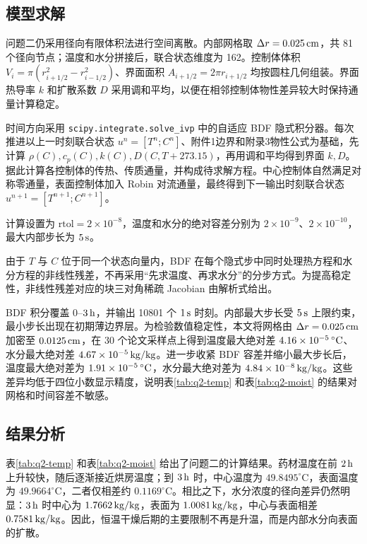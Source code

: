 \documentclass[UTF8,a4paper,12pt]{ctexart}
\begin{document}
\subsection{模型求解}
问题二仍采用径向有限体积法进行空间离散。内部网格取 $\Delta r=0.025\rm\,cm$，共 81 个径向节点；温度和水分拼接后，联合状态维度为 162。控制体体积 $V_i=\pi(r_{i+1/2}^2-r_{i-1/2}^2)$、界面面积 $A_{i+1/2}=2\pi r_{i+1/2}$ 均按圆柱几何组装。界面热导率 $k$ 和扩散系数 $D$ 采用调和平均，以便在相邻控制体物性差异较大时保持通量计算稳定。

时间方向采用 \texttt{scipy.integrate.solve\_ivp} 中的自适应 BDF 隐式积分器。每次推进以上一时刻联合状态 $u^n=[T^n;C^n]$、附件1边界和附录3物性公式为基础，先计算 $\rho(C),c_p(C),k(C),D(C,T+273.15)$，再用调和平均得到界面 $k,D$。据此计算各控制体的传热、传质通量，并构成待求解方程。中心控制体自然满足对称零通量，表面控制体加入 Robin 对流通量，最终得到下一输出时刻联合状态 $u^{n+1}=[T^{n+1};C^{n+1}]$。

计算设置为 $\mathrm{rtol}=2\times10^{-8}$，温度和水分的绝对容差分别为 $2\times10^{-9}$、$2\times10^{-10}$，最大内部步长为 $5\rm\,s$。

由于 $T$ 与 $C$ 位于同一个状态向量内，BDF 在每个隐式步中同时处理热方程和水分方程的非线性残差，不再采用“先求温度、再求水分”的分步方式。为提高稳定性，非线性残差对应的块三对角稀疏 Jacobian 由解析式给出。

BDF 积分覆盖 $0$--$3\rm\,h$，并输出 10801 个 $1\rm\,s$ 时刻。内部最大步长受 $5\rm\,s$ 上限约束，最小步长出现在初期薄边界层。为检验数值稳定性，本文将网格由 $\Delta r=0.025\rm\,cm$ 加密至 $0.0125\rm\,cm$，在 30 个论文采样点上得到温度最大绝对差 $4.16\times10^{-5}\rm\,{}^\circ\mathrm C$、水分最大绝对差 $4.67\times10^{-5}\rm\,kg/kg$。进一步收紧 BDF 容差并缩小最大步长后，温度最大绝对差为 $1.91\times10^{-5}\rm\,{}^\circ\mathrm C$，水分最大绝对差为 $4.84\times10^{-8}\rm\,kg/kg$。这些差异均低于四位小数显示精度，说明表\ref{tab:q2-temp} 和表\ref{tab:q2-moist} 的结果对网格和时间容差不敏感。

\subsection{结果分析}
表\ref{tab:q2-temp} 和表\ref{tab:q2-moist} 给出了问题二的计算结果。药材温度在前 $2\rm\,h$ 上升较快，随后逐渐接近烘房温度；到 $3\rm\,h$ 时，中心温度为 $49.8495^\circ\mathrm C$，表面温度为 $49.9664^\circ\mathrm C$，二者仅相差约 $0.1169^\circ\mathrm C$。相比之下，水分浓度的径向差异仍然明显：$3\rm\,h$ 时中心为 $1.7662\rm\,kg/kg$，表面为 $1.0081\rm\,kg/kg$，中心与表面相差 $0.7581\rm\,kg/kg$。因此，恒温干燥后期的主要限制不再是升温，而是内部水分向表面的扩散。
\end{document}
